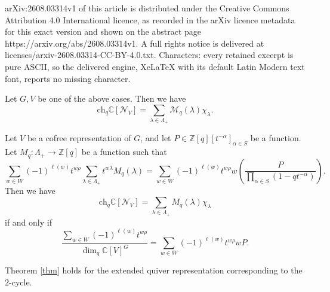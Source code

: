 \documentclass[10pt,a4paper]{amsart}
\newcommand{\C}{\mathbb{C}}
\newcommand{\M}{\mathcal{M}}
\newcommand{\N}{\mathcal{N}}
\newcommand{\Z}{\mathbb{Z}}
\newcommand{\ch}{\mathrm{ch}}
\begin{document}
arXiv:2608.03314v1 of this article is distributed under the Creative Commons Attribution 4.0 International licence, as recorded in the arXiv licence metadata for this exact version and shown on the abstract page https://arxiv.org/abs/2608.03314v1. A full rights notice is delivered at licenses/arxiv-2608.03314-CC-BY-4.0.txt. Characters: every retained excerpt is pure ASCII, so the delivered engine, XeLaTeX with its default Latin Modern text font, reports no missing character.
\begin{theorem}\label{thm}
    Let $G,V$ be one of the above cases. Then we have
    \[\ch_q\C[\N_V]=\sum_{\lambda\in\Lambda_+}\M_q(\lambda)\chi_\lambda.\]
\end{theorem}

\begin{proposition}\label{prop:hesselink}
    Let $V$ be a cofree representation of $G$, and let $P\in\Z[q][t^{-\alpha}]_{\alpha\in S}$ be a function. Let $M_q:\Lambda_+\to\Z[q]$ be a function such that
    \[\sum_{w\in W}(-1)^{\ell(w)}t^{w\rho}\sum_{\lambda\in\Lambda_+}t^{w\lambda}M_q(\lambda)=\sum_{w\in W}(-1)^{\ell(w)}t^{w\rho}w\left(\frac{P}{\prod_{\alpha\in S}(1-qt^{-\alpha})}\right).\]
    Then we have
    \[\ch_q\C[\N_V]=\sum_{\lambda\in\Lambda_+}M_q(\lambda)\chi_\lambda\]
    if and only if
    \begin{equation}
        \frac{\sum_{w\in W}(-1)^{\ell(w)}t^{w\rho}}{\dim_q\C[V]^G}=\sum_{w\in W}(-1)^{\ell(w)}t^{w\rho}wP.\label{eq:hesselink}
    \end{equation}
\end{proposition}

\begin{proposition}\label{prop:2cycle}
    Theorem \ref{thm} holds for the extended quiver representation corresponding to the $2$-cycle.
\end{proposition}
\end{document}

